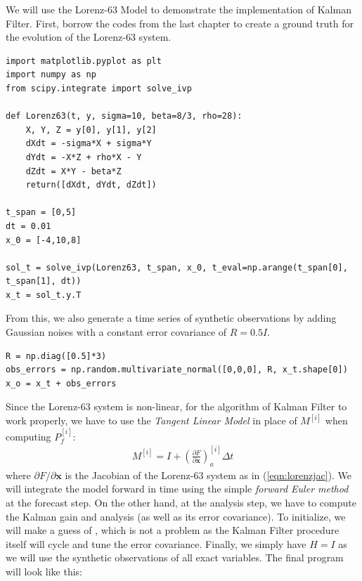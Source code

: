 We will use the Lorenz-63 Model to demonstrate the implementation of Kalman Filter. First, borrow the codes from the last chapter to create a ground truth for the evolution of the Lorenz-63 system.
\begin{lstlisting}
import matplotlib.pyplot as plt
import numpy as np
from scipy.integrate import solve_ivp

def Lorenz63(t, y, sigma=10, beta=8/3, rho=28):
    X, Y, Z = y[0], y[1], y[2]
    dXdt = -sigma*X + sigma*Y
    dYdt = -X*Z + rho*X - Y
    dZdt = X*Y - beta*Z
    return([dXdt, dYdt, dZdt])

t_span = [0,5]
dt = 0.01
x_0 = [-4,10,8]

sol_t = solve_ivp(Lorenz63, t_span, x_0, t_eval=np.arange(t_span[0], t_span[1], dt))
x_t = sol_t.y.T
\end{lstlisting}
From this, we also generate a time series of synthetic observations by adding Gaussian noises with a constant error covariance of $R = 0.5I$.
\begin{lstlisting}
R = np.diag([0.5]*3)
obs_errors = np.random.multivariate_normal([0,0,0], R, x_t.shape[0])
x_o = x_t + obs_errors    
\end{lstlisting}
Since the Lorenz-63 system is non-linear, for the algorithm of Kalman Filter to work properly, we have to use the \textit{Tangent Linear Model} in place of $M^{[i]}$ when computing $P_f^{[i]}$:
\begin{align}
M^{[i]} = I + (\frac{\partial F}{\partial \textbf{x}})_a^{[i]} \Delta t
\end{align}
where $\partial F/\partial \textbf{x}$ is the Jacobian of the Lorenz-63 system as in (\ref{eqn:lorenzjac}). We will integrate the model forward in time using the simple \textit{forward Euler method} at the forecast step. On the other hand, at the analysis step, we have to compute the Kalman gain and analysis (as well as its error covariance). To initialize, we will make a guess of , which is not a problem as the Kalman Filter procedure itself will cycle and tune the error covariance. Finally, we simply have $H = I$ as we will use the synthetic observations of all exact variables. The final program will look like this:

